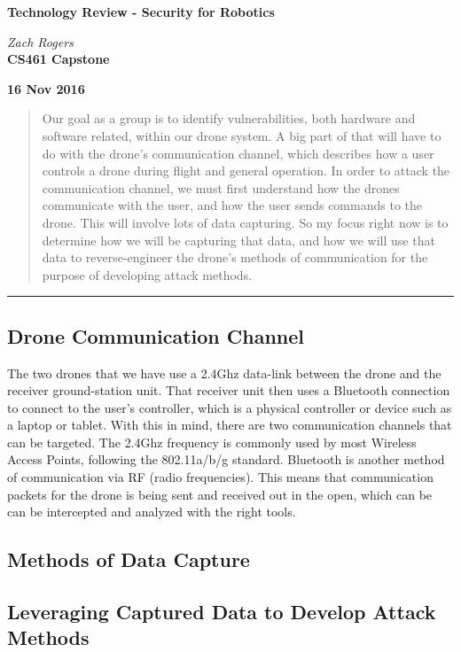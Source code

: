 \documentclass[IEEEtran,letterpaper,10pt,titlepage,draftclsnofoot,onecolumn]{article}
\begin{document}
\begin{titlepage}
  \begin{center}
    \vspace*{1cm}

    \huge
    \textbf{Technology Review - Security for Robotics}
  \vspace{0.5cm}

    \textit{Zach Rogers}\\
  \vspace{0.5cm}
    \vfill
    \large
    \textbf{CS461 Capstone}\\
  \vspace{5mm}

    \textbf{16 Nov 2016}\\

    \vfill
    \end{center}
\end{titlepage}

\begin{abstract}
Our goal as a group is to identify vulnerabilities, both hardware and software related, within our drone system. A big part of that will have to do with
the drone's communication channel, which describes how a user controls a drone during flight and general operation. In order to attack the communication
channel, we must first understand how the drones communicate with the user, and how the user sends commands to the drone. This will involve lots of data
capturing. So my focus right now is to determine how we will be capturing that data, and how we will use that data to reverse-engineer the drone's methods
of communication for the purpose of developing attack methods.
\end{abstract}

\hrule\vspace{5mm}
\subsection*{Drone Communication Channel}
The two drones that we have use a 2.4Ghz data-link between the drone and the receiver ground-station unit. That receiver unit then uses a Bluetooth
connection to connect to the user's controller, which is a physical controller or device such as a laptop or tablet. With this in mind, there are two
communication channels that can be targeted. The 2.4Ghz frequency is commonly used by most Wireless Access Points, following the 802.11a/b/g standard.
Bluetooth is another method of communication via RF (radio frequencies). This means that communication packets for the drone is being sent and received
out in the open, which can be can be intercepted and analyzed with the right tools.

\subsection*{Methods of Data Capture}


\subsection*{Leveraging Captured Data to Develop Attack Methods}
\end{document}
